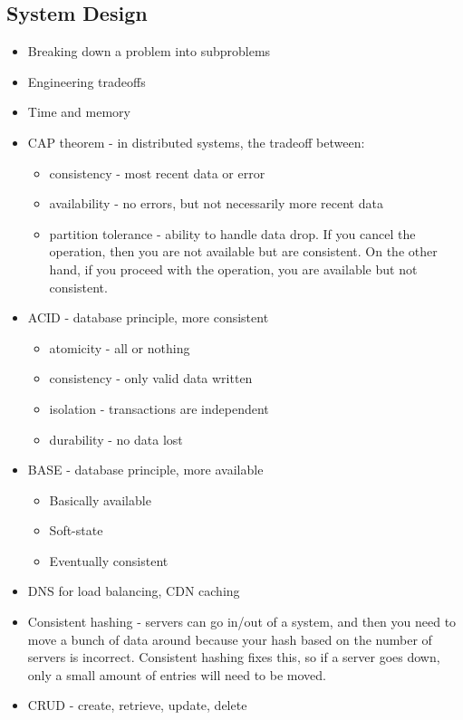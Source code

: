 \documentclass[10pt]{article}
\begin{document}
\subsection{System Design}
\begin{itemize}
    \item Breaking down a problem into subproblems
    \item Engineering tradeoffs
    \item Time and memory
    \item CAP theorem - in distributed systems, the tradeoff between:
    \begin{itemize}
        \item consistency - most recent data or error
        \item availability - no errors, but not necessarily more recent data
        \item partition tolerance - ability to handle data drop. If you cancel the operation, then you are not available but are consistent. On the other hand, if you proceed with the operation, you are available but not consistent.
    \end{itemize}
    \item ACID - database principle, more consistent
    \begin{itemize}
        \item atomicity - all or nothing
        \item consistency - only valid data written
        \item isolation - transactions are independent
        \item durability - no data lost
    \end{itemize}
    \item BASE - database principle, more available
    \begin{itemize}
        \item Basically available
        \item Soft-state
        \item Eventually consistent
    \end{itemize}
    \item DNS for load balancing, CDN caching
    \item Consistent hashing - servers can go in/out of a system, and then you need to move a bunch of data around because your hash based on the number of servers is incorrect. Consistent hashing fixes this, so if a server goes down, only a small amount of entries will need to be moved.
    \item CRUD - create, retrieve, update, delete
\end{itemize}
\end{document}
